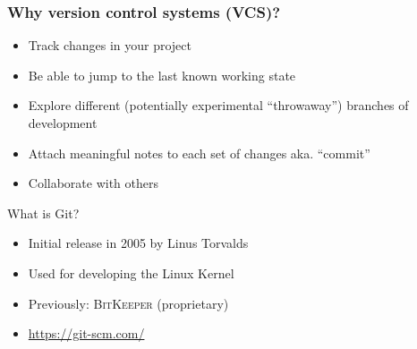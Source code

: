 \documentclass[compress,aspectratio=169]{beamer}
\begin{document}
\begin{frame}
  \frametitle{Why version control systems (VCS)?}
  \begin{itemize}
    \item Track changes in your project
    \item Be able to jump to the last known working state
    \item Explore different (potentially experimental ``throwaway'') branches of development
    \item Attach meaningful notes to each set of changes aka. ``commit''
    \item Collaborate with others
  \end{itemize}
\end{frame}
\begin{frame}{What is Git?}
  \begin{minipage}[t]{0.3\linewidth}
  \end{minipage}\hfill
  \begin{minipage}[t]{0.7\linewidth}
      \begin{itemize}
          \item Initial release in 2005 by Linus Torvalds
          \item Used for developing the Linux Kernel 
          \item Previously: \textsc{BitKeeper} (proprietary)
          \item<3-> \url{https://git-scm.com/}
              \begin{itemize}

\end{itemize}
\end{itemize}
\end{minipage}
\end{frame}
\end{document}
